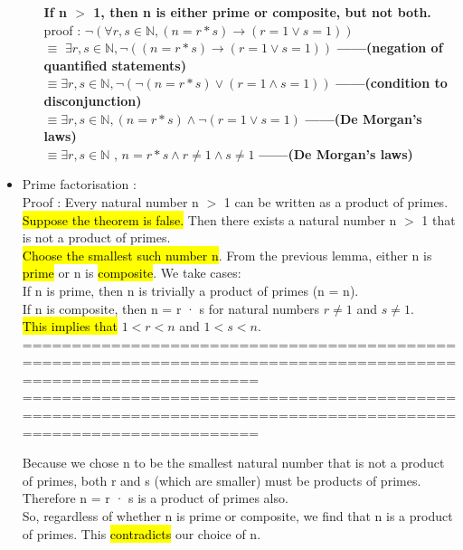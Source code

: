 \documentclass{article}
\begin{document}
\begin{itemize}
\begin{itemize}
\textbf{If n $>$ 1, then n is either prime or composite, but not both.}\\
proof : $\neg (\forall r,s \in \mathbb{N}, (n = r * s) \rightarrow (r=1 \lor s=1))$\\
$\equiv$ $\exists r,s \in  \mathbb{N} ,\neg((n = r* s) \rightarrow (r = 1 \lor s = 1))$	\textbf{------(negation of quantified statements)}\\
$\equiv \exists r,s \in  \mathbb{N} ,\neg (\neg (n = r * s) \lor (r = 1 \land s = 1))$	\textbf{------(condition to disconjunction)}\\
$\equiv \exists r,s \in  \mathbb{N} ,(n = r * s) \land  \neg(r = 1 \lor s = 1)$		\textbf{------(De Morgan's laws)}\\
$\equiv \exists r,s \in \mathbb{N}$ , $n = r * s \land r \neq 1\land s \neq 1$	\textbf{------(De Morgan's laws)}\\

\end{itemize}



\item Prime factorisation : \\
Proof : Every natural number n $>$ 1 can be written as a product of primes.\\
\hl{Suppose the theorem is false.} Then there exists a natural number n $>$ 1 that is not a product of primes.\\

\hl{Choose the smallest such number n}. From the previous lemma, either n is \hl{prime} or n is \hl{composite}. We take cases:\\

If n is prime, then n is trivially a product of primes (n = n).\\
If n is composite, then n = r · s for natural numbers $r \neq 1$ and $s \neq 1$.\\
\hl{This implies that} $1 < r < n$ and $1 < s < n$.\\

================================================================================================================
\newpage
================================================================================================================

Because we chose n to be the smallest natural number that is not a
product of primes, both r and s (which are smaller) must be products
of primes. Therefore n = r · s is a product of primes also.\\
So, regardless of whether n is prime or composite, we find that n is a
product of primes. This \hl{contradicts} our choice of n.


\end{itemize}
\end{document}
